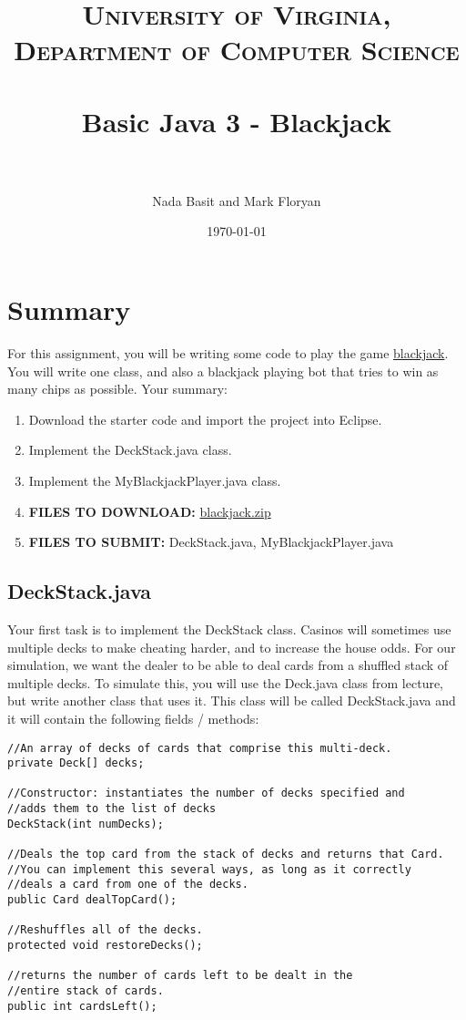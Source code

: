 \documentclass[paper=a4, fontsize=11pt, parskip=full]{scrartcl} %
\title{
\normalfont \normalsize
\textsc{University of Virginia, Department of Computer Science} \\ [25pt] %
\horrule{0.5pt} \\[0.4cm] %
\huge Basic Java 3 - Blackjack \\ %
\horrule{2pt} \\[0.5cm] %
}
\author{Nada Basit and Mark Floryan}
\date{\normalsize\today} %
\numberwithin{equation}{section} %
\numberwithin{figure}{section} %
\numberwithin{table}{section} %
\begin{document}
\maketitle %


\section{Summary}

For this assignment, you will be writing some code to play the game \href{https://en.wikipedia.org/wiki/Blackjack}{blackjack}. You will write one class, and also a blackjack playing bot that tries to win as many chips as possible. Your summary:

\begin{enumerate}
	\item Download the starter code and import the project into Eclipse.
	\item Implement the DeckStack.java class.
	\item Implement the MyBlackjackPlayer.java class.
	\item \textbf{FILES TO DOWNLOAD:} \href{https://uva-cs.github.io/dsa1/homeworks/BasicJava3/code/blackjack.zip}{blackjack.zip}
	\item \textbf{FILES TO SUBMIT:} DeckStack.java, MyBlackjackPlayer.java
\end{enumerate}


\subsection{DeckStack.java}

Your first task is to implement the DeckStack class. Casinos will sometimes use multiple decks to make cheating harder, and to increase the house odds. For our simulation, we want the dealer to be able to deal cards from a shuffled stack of multiple decks. To simulate this, you will use the Deck.java class from lecture, but write another class that uses it. This class will be called DeckStack.java and it will contain the following fields / methods:

\begin{lstlisting}
//An array of decks of cards that comprise this multi-deck.
private Deck[] decks;

//Constructor: instantiates the number of decks specified and
//adds them to the list of decks
DeckStack(int numDecks);

//Deals the top card from the stack of decks and returns that Card.
//You can implement this several ways, as long as it correctly
//deals a card from one of the decks.
public Card dealTopCard();

//Reshuffles all of the decks.
protected void restoreDecks();

//returns the number of cards left to be dealt in the
//entire stack of cards.
public int cardsLeft();
\end{lstlisting}
\end{document}
